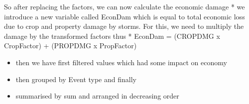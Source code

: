 \documentclass[]{article}
\newenvironment{Shaded}{\begin{snugshade}}{\end{snugshade}}
\newcommand{\DecValTok}[1]{\textcolor[rgb]{0.00,0.00,0.81}{#1}}
\newcommand{\StringTok}[1]{\textcolor[rgb]{0.31,0.60,0.02}{#1}}
\newcommand{\OperatorTok}[1]{\textcolor[rgb]{0.81,0.36,0.00}{\textbf{#1}}}
\newcommand{\NormalTok}[1]{#1}
\providecommand{\tightlist}{%
  \setlength{\itemsep}{0pt}\setlength{\parskip}{0pt}}
\begin{document}
\begin{Shaded}
\end{Shaded}

So after replacing the factors, we can now calculate the economic damage
* we introduce a new variable called EconDam which is equal to total
economic loss due to crop and property damage by storms. For this, we
need to multiply the damage by the transformed factors thus * EconDam =
(CROPDMG x CropFactor) + (PROPDMG x PropFactor)

\begin{itemize}
\tightlist
\item
  then we have first filtered values which had some impact on economy
\item
  then grouped by Event type and finally
\item
  summarised by sum and arranged in decreasing order
\end{itemize}
\end{document}
